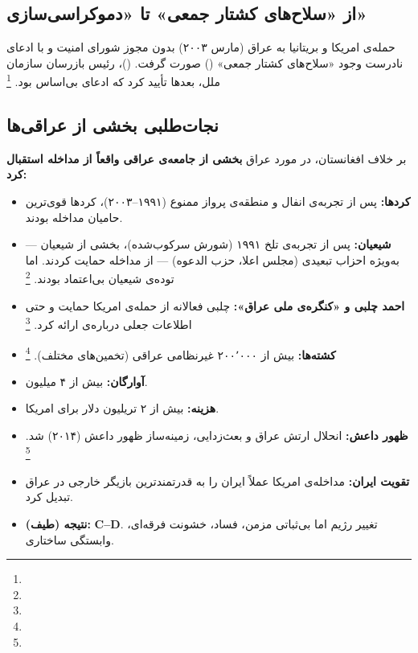 \subsection{از «سلاح‌های کشتار جمعی» تا «دموکراسی‌سازی»}

حمله‌ی امریکا و بریتانیا به عراق (مارس ۲۰۰۳) بدون مجوز شورای امنیت و با ادعای نادرست وجود «سلاح‌های کشتار جمعی» () صورت گرفت.  ()، رئیس بازرسان سازمان ملل، بعدها تأیید کرد که ادعای  بی‌اساس بود.%
\footnote{}

\subsection{نجات‌طلبی بخشی از عراقی‌ها}

بر خلاف افغانستان، در مورد عراق \textbf{بخشی از جامعه‌ی عراقی واقعاً از مداخله استقبال کرد:}
\begin{itemize}[nosep, rightmargin=1em]
  \item \textbf{کردها:} پس از تجربه‌ی انفال و منطقه‌ی پرواز ممنوع (۱۹۹۱–۲۰۰۳)، کردها قوی‌ترین حامیان مداخله بودند.
  \item \textbf{شیعیان:} پس از تجربه‌ی تلخ ۱۹۹۱ (شورش سرکوب‌شده)، بخشی از شیعیان — به‌ویژه احزاب تبعیدی (مجلس اعلا، حزب الدعوه) — از مداخله حمایت کردند. اما توده‌ی شیعیان بی‌اعتماد بودند.%
  \footnote{}
  \item \textbf{احمد چلبی و «کنگره‌ی ملی عراق»:} چلبی فعالانه از حمله‌ی امریکا حمایت و حتی اطلاعات جعلی درباره‌ی  ارائه کرد.%
  \footnote{}
\end{itemize}

\begin{tcolorbox}[enemybox, title={نتایج فاجعه‌بار عراق}]
\begin{itemize}[nosep, rightmargin=1em]
  \item \textbf{کشته‌ها:} بیش از ۲۰۰٬۰۰۰ غیرنظامی عراقی (تخمین‌های مختلف).%
  \footnote{}
  \item \textbf{آوارگان:} بیش از ۴ میلیون.
  \item \textbf{هزینه:} بیش از ۲ تریلیون دلار برای امریکا.
  \item \textbf{ظهور داعش:} انحلال ارتش عراق و بعث‌زدایی، زمینه‌ساز ظهور داعش (۲۰۱۴) شد.%
  \footnote{}
  \item \textbf{تقویت ایران:} مداخله‌ی امریکا عملاً ایران را به قدرتمندترین بازیگر خارجی در عراق تبدیل کرد.
  \item \textbf{نتیجه (طیف):} \textbf{C–D}. تغییر رژیم اما بی‌ثباتی مزمن، فساد، خشونت فرقه‌ای، وابستگی ساختاری.
\end{itemize}
\end{tcolorbox}


